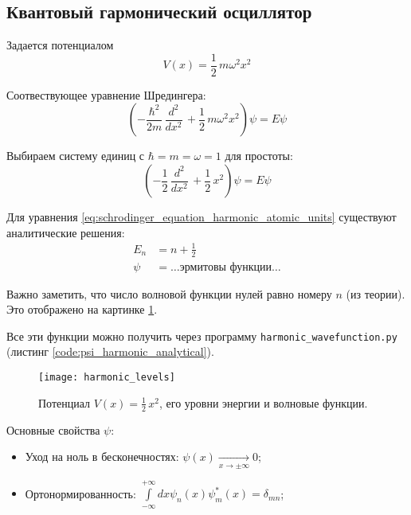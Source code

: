 \setcounter{chapter}{4}
\begin{lecture}
\section{Квантовый гармонический осциллятор}
Задается потенциалом
\begin{equation}
    \label{eq:harmonic_potential_def}
    V(x) = \frac{1}{2}\, m \omega^2 x^2
\end{equation}

Соотвествующее уравнение Шредингера:
\begin{equation}
    \label{eq:schrodinger_equation_harmonic}
    \left( -\frac{\hbar^2}{2m}\, \frac{d^2}{dx^2}\, + \frac{1}{2}\, m \omega^2 x^2 \right) \psi = E \psi
\end{equation}

Выбираем систему единиц с $\hbar = m = \omega = 1$ для простоты:
\begin{equation}
    \label{eq:schrodinger_equation_harmonic_atomic_units}
    \left( -\frac{1}{2}\, \frac{d^2}{dx^2}\, + \frac{1}{2}\, x^2 \right) \psi = E \psi
\end{equation}

Для уравнения \eqref{eq:schrodinger_equation_harmonic_atomic_units} существуют аналитические решения:
\begin{align}
    E_n &= n + \frac{1}{2} \\
    \psi &= \dots \text{эрмитовы функции} \dots
\end{align}

Важно заметить, что число волновой функции нулей равно номеру $n$ (из теории).
Это отображено на картинке \ref{fig:harmonic_levels}.

Все эти функции можно получить через программу \texttt{harmonic\_wavefunction.py} (листинг \ref{code:psi_harmonic_analytical}).
\begin{figure}[!h]
    \label{fig:harmonic_levels}
    \centering
    \texttt{[image: harmonic\_levels]}
    \caption{Потенциал $V(x) = \frac{1}{2}\, x^2$, его уровни энергии и волновые функции.} 
\end{figure}
\newpage
{}

Основные свойства $\psi$:
\begin{itemize}
    \item Уход на ноль в бесконечностях: $\psi (x) \xrightarrow[x\rightarrow \pm \infty]{} 0$;
    \item Ортонормированность: $\int\limits_{- \infty}^{+\infty} dx \psi_n (x) \psi_m^* (x) = \delta_{mn}$;
\end{itemize}


\end{lecture}
